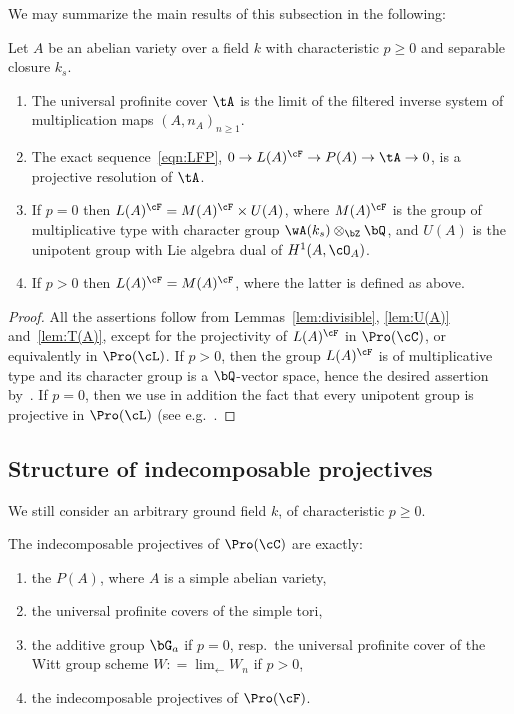 We may summarize the main results of this subsection in the following:

\begin{theo}\label{thm:P(A)}
Let $A$ be an abelian variety over a field $k$ with characteristic $p \geq 0$ and separable closure $k_s$.
\begin{enumerate}\romanenumi
\item \label{3.10.1} The universal profinite cover $\tA$ is the limit of the filtered inverse system of multiplication maps $(A,n_A)_{n \geq 1}$.
\item \label{3.10.2} The exact sequence~\eqref{eqn:LFP}, $0 \to L(A)^{\cF} \to P(A) \to \tA \to 0$, is a projective resolution of $\tA$.
\item \label{3.10.3} If $p = 0$ then $L(A)^{\cF} = M(A)^{\cF} \times U(A)$, where $M(A)^{\cF}$ is the group of multiplicative type with character group $\wA(k_s) \otimes_{\bZ} \bQ$, and $U(A)$ is the unipotent group with Lie algebra dual of $H^1(A,\cO_A)$.
\item \label{3.10.4} If $p > 0$ then $L(A)^{\cF} = M(A)^{\cF}$, where the latter is defined as above.
\end{enumerate}
\end{theo}

\begin{proof}
All the assertions follow from Lemmas~\ref{lem:divisible}, \ref{lem:U(A)} and~\ref{lem:T(A)}, except for the projectivity of $L(A)^{\cF}$ in $\Pro(\cC)$, or equivalently in $\Pro(\cL)$. If $p > 0$, then the group $L(A)^{\cF}$ is of multiplicative type and its character group is a $\bQ$-vector space, hence the desired assertion by~\cite[V.3.5.2]{DG}. If $p = 0$, then we use in addition the fact that every unipotent group is projective in $\Pro(\cL)$ (see e.g.~\cite[V.3.6.5]{DG}.
\end{proof}

\subsection{Structure of indecomposable projectives}\label{subsec:indproj}

We still consider an arbitrary ground field $k$, of characteristic $p \geq 0$.

\begin{prop}\label{prop:projind}
The indecomposable projectives of $\Pro(\cC)$ are exactly:
\begin{enumerate}\romanenumi
\item \label{3.11.1} the $P(A)$, where $A$ is a simple abelian variety,
\item \label{3.11.2} the universal profinite covers of the simple tori,
\item \label{3.11.3} the additive group $\bG_a$ if $p = 0$, resp.~the universal profinite cover of the Witt group scheme $W : = \lim_{\leftarrow} W_n$ if $p > 0$,
\item \label{3.11.4} the indecomposable projectives of $\Pro(\cF)$.
\end{enumerate}
\end{prop}

